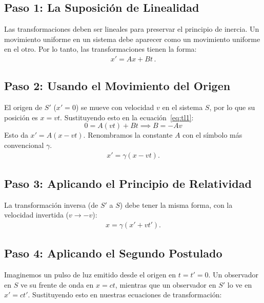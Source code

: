 \documentclass[11pt,a4paper]{book}
\begin{document}
\subsection{Paso 1: La Suposición de Linealidad}

Las transformaciones deben ser lineales para preservar el principio de inercia. Un movimiento uniforme en un sistema debe aparecer como un movimiento uniforme en el otro. Por lo tanto, las transformaciones tienen la forma:
\begin{align}
\label{eq:tl1}
 x' = Ax + Bt\,.   
\end{align}
 
\subsection{Paso 2: Usando el Movimiento del Origen}

El origen de $S'$ ($x'=0$) se mueve con velocidad $v$ en el sistema $S$, por lo que su posición es $x=vt$. Sustituyendo esto en la ecuación~\eqref{eq:tl1}:
\[ 0 = A(vt) + Bt \implies B = -Av \]
Esto da $x' = A(x-vt)$. Renombramos la constante $A$ con el símbolo más convencional $\gamma$.
\begin{align}
\label{eq:xplt}
x' = \gamma (x - vt).    
\end{align}

\subsection{Paso 3: Aplicando el Principio de Relatividad}

La transformación inversa (de $S'$ a $S$) debe tener la misma forma, con la velocidad invertida ($v \to -v$):
\begin{align}
\label{eq:invxplt}
    x = \gamma (x' + vt').
\end{align}

\subsection{Paso 4: Aplicando el Segundo Postulado}
Imaginemos un pulso de luz emitido desde el origen en $t=t'=0$. Un observador en $S$ ve su frente de onda en $x=ct$, mientras que un observador en $S'$ lo ve en $x'=ct'$. Sustituyendo esto en nuestras ecuaciones de transformación:

\end{document}
